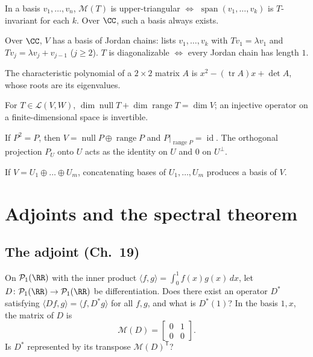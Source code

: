 \documentclass[10pt]{scrartcl}
\DeclareMathOperator{\tr}{tr}\DeclareMathOperator{\nul}{null}\DeclareMathOperator{\range}{range}\DeclareMathOperator{\spn}{span}
\newcommand{\LL}{\mathcal L}\newcommand{\PP}{\mathcal P}\newcommand{\MM}{\mathcal M}
\begin{document}
\begin{enumerate}[label=(T\arabic*),leftmargin=2.6em,itemsep=8pt]
  \ii {} In a basis $v_1,\dots,v_n$, $\MM(T)$ is upper-triangular $\iff$ $\spn(v_1,\dots,v_k)$ is $T$-invariant for each $k$. Over $\CC$, such a basis always exists.

  \ii {} Over $\CC$, $V$ has a basis of Jordan chains: lists $v_1,\dots,v_k$ with $Tv_1=\lambda v_1$ and $Tv_j=\lambda v_j+v_{j-1}$ ($j\ge2$). $T$ is diagonalizable $\iff$ every Jordan chain has length $1$.

  \ii {} The characteristic polynomial of a $2\times2$ matrix $A$ is $x^2-(\tr A)x+\det A$, whose roots are its eigenvalues.

  \ii {} For $T\in\LL(V,W)$, $\dim\nul T+\dim\range T=\dim V$; an injective operator on a finite-dimensional space is invertible.

  \ii {} If $P^2=P$, then $V=\nul P\oplus\range P$ and $P|_{\range P}=\operatorname{id}$. The orthogonal projection $P_U$ onto $U$ acts as the identity on $U$ and $0$ on $U^\perp$.

  \ii {} If $V=U_1\oplus\dots\oplus U_m$, concatenating bases of $U_1,\dots,U_m$ produces a basis of $V$.
\end{enumerate}

\section{Adjoints and the spectral theorem}

\subsection{The adjoint (Ch.~19)}

\begin{qbox}
  On $\PP_1(\RR)$ with the inner product $\langle f,g\rangle=\int_0^1 f(x)g(x)\,dx$, let $D\colon\PP_1(\RR)\to\PP_1(\RR)$ be differentiation. Does there exist an operator $D^*$ satisfying $\langle Df,g\rangle=\langle f,D^*g\rangle$ for all $f,g$, and what is $D^*(1)$? In the basis $1,x$, the matrix of $D$ is
  \[
    \MM(D)=\begin{bmatrix}0&1\\0&0\end{bmatrix}.
  \]
  Is $D^*$ represented by its transpose $\MM(D)^{\mathsf T}$?
\end{qbox}
\end{document}
